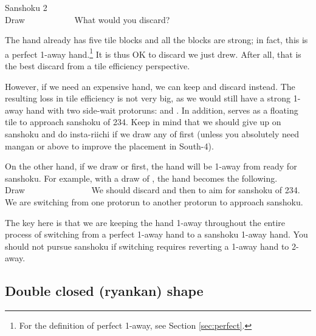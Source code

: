 \begin{itembox}[r]{{\jap Sanshoku} 2}
\bp
{}~\\
\hfill\footnotesize{Draw~~~~~~~~~~~}
\ep
\vspace{-17pt}What would you discard? \vspace{-5pt}
\end{itembox}
\noindent
The hand already has five tile blocks and all the blocks are strong; in fact, this is a perfect 1-away hand.\footnote{For the definition of perfect 1-away, see Section \ref{sec:perfect}.} It is thus OK to discard {\LARGE{}} we just drew. After all, that is the best discard from a tile efficiency perspective. 

\bigskip
However, if we need an expensive hand, we can keep {\LARGE{}} and discard {\LARGE{}} instead. The resulting loss in tile efficiency is not very big, as we would still have a strong 1-away hand with two side-wait protoruns: {\LARGE{}} and {\LARGE{}}. In addition, {\LARGE{}} serves as a floating tile to approach {\jap sanshoku} of 234. 
Keep in mind that we should give up on {\jap sanshoku} and do insta-riichi if we draw any of {\LARGE{}} first (unless you absolutely need {\jap mangan} or above to improve the placement in South-4). 

\bigskip
On the other hand, if we draw {\LARGE{}} or {\LARGE{}} first, the hand will be 1-away from ready for {\jap sanshoku}. For example, with a draw of {\LARGE{}}, the hand becomes the following. 
\bp
{}~\\
\hfill\footnotesize{Draw~~~~~~~~~~~~~~~}
\ep
We should discard {\LARGE{}} and then {\LARGE{}} to aim for {\jap sanshoku} of 234. We are switching from one protorun {\LARGE{}} to another protorun {\LARGE{}} to approach {\jap sanshoku}. 

\bigskip
The key here is that we are keeping the hand 1-away throughout the entire process of switching from a perfect 1-away hand to a {\jap sanshoku} 1-away hand. You should not pursue {\jap sanshoku} if switching requires reverting a 1-away hand to 2-away. 


\bigskip
\subsection{Double closed ({\jap ryankan}) shape}\label{sec:san3}

